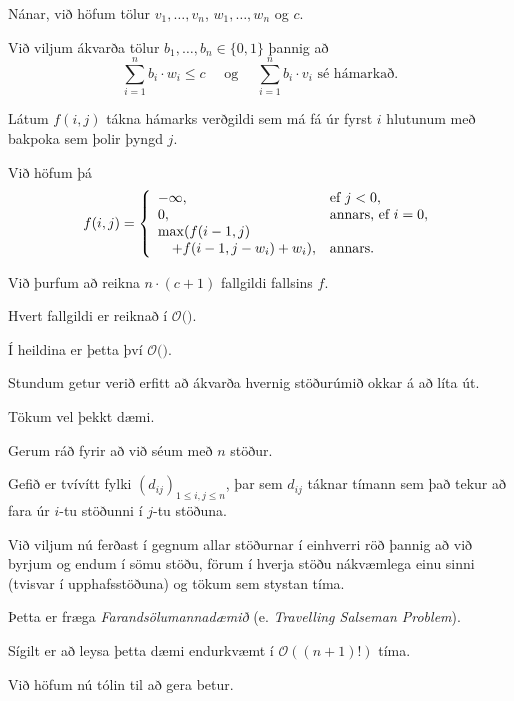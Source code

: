 {
	{
		\item<1-> Nánar, við höfum tölur $v_1, \dots, v_n$, $w_1, \dots, w_n$ og $c$.
		\item<2-> Við viljum ákvarða tölur $b_1, \dots, b_n \in \{0, 1\}$ þannig að
		\[
			\sum_{i = 1}^n b_i \cdot w_i \leq c
			\quad \text{ og } \quad
			\sum_{i = 1}^n b_i \cdot v_i \text{ sé hámarkað}.
		\]
		\item<3-> Látum $f(i, j)$ tákna hámarks verðgildi sem má fá úr fyrst $i$ hlutunum með bakpoka sem þolir þyngd $j$.
		\item<4-> Við höfum þá
		\[
			f(i, j) =
			\left \{
			\env{array}
			{
				{l l}
				-\infty, & \text{ef $j < 0$},\\
				0, & \text{annars, ef $i = 0$},\\
				\max(f(i - 1, j) \\
						\quad + f(i - 1, j - w_i) + w_i), & \text{annars}.
			}
			\right .
		\]
	}
}

{
}

{
	{
		\item<1-> Við þurfum að reikna $n \cdot (c + 1)$ fallgildi fallsins $f$.
		\item<2-> Hvert fallgildi er reiknað í $\mathcal{O}($\onslide<3->{$\,1\,$}$)$.
		\item<4-> Í heildina er þetta því $\mathcal{O}($\onslide<5->{$n \cdot c$}$)$.
	}
}

{
	{
		\item<1-> Stundum getur verið erfitt að ákvarða hvernig stöðurúmið okkar á að líta út.
		\item<2-> Tökum vel þekkt dæmi.
		\item<3-> Gerum ráð fyrir að við séum með $n$ stöður.
		\item<4-> Gefið er tvívítt fylki $(d_{ij})_{1 \leq i, j \leq n}$,
					þar sem $d_{ij}$ táknar tímann sem það tekur að fara úr $i$-tu stöðunni í $j$-tu stöðuna.
		\item<5-> Við viljum nú ferðast í gegnum allar stöðurnar í einhverri röð þannig að við	
					byrjum og endum í sömu stöðu, förum í hverja stöðu nákvæmlega einu sinni (tvisvar í upphafsstöðuna) og tökum sem stystan tíma.
		\item<6-> Þetta er fræga \emph{Farandsölumannadæmið} (e. \emph{Travelling Salseman Problem}).
		\item<7-> Sígilt er að leysa þetta dæmi endurkvæmt í $\mathcal{O}((n + 1)!)$ tíma.
		\item<8-> Við höfum nú tólin til að gera betur.
	}
}

